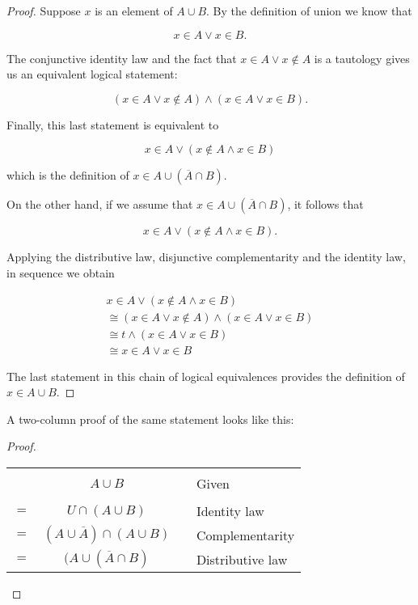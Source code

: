 \begin{proof}
Suppose $x$ is an element of $A \cup B$.  By the definition of union we
know that 

\[ x \in A \lor x \in B. \]

The conjunctive identity law and the
fact that $x \in A \lor x \notin A$ is a tautology gives us an equivalent
logical statement:

\[ (x \in A \lor x \notin A) \land (x \in A \lor x \in B). \]

Finally, this last statement is equivalent to

\[ x \in A \lor (x \notin A \land x \in B) \]

\noindent which is the definition of $x \in A \cup (\overline{A} \cap B)$.

On the other hand, if we assume that $x \in A \cup (\overline{A} \cap B)$, it follows that 

\[ x \in A \lor (x \notin A \land x \in B). \]

Applying the distributive law, disjunctive complementarity and the identity law,
in sequence we obtain

\begin{gather*} 
 x \in A \lor (x \notin A \land x \in B) \\
\cong (x \in A \lor x \notin A) \land (x \in A \lor x \in B) \\
\cong t \land (x \in A \lor x \in B) \\
\cong x \in A \lor x \in B
\end{gather*}

The last statement in this chain of logical equivalences provides the definition of $x \in A \cup B$.

\end{proof}

A two-column proof of the same statement looks like this:

\begin{proof}

\begin{tabular}{cccl}
  & $A \cup B$ & \rule{36pt}{0pt} & Given \\
$=$ & $U \cap (A \cup B)$ & & Identity law \\
$=$ & $(A \cup \overline{A}) \cap (A \cup B)$ & & Complementarity \\
$=$ & $(A \cup (\overline{A} \cap B)$ & & Distributive law\\
\end{tabular}

\end{proof}

